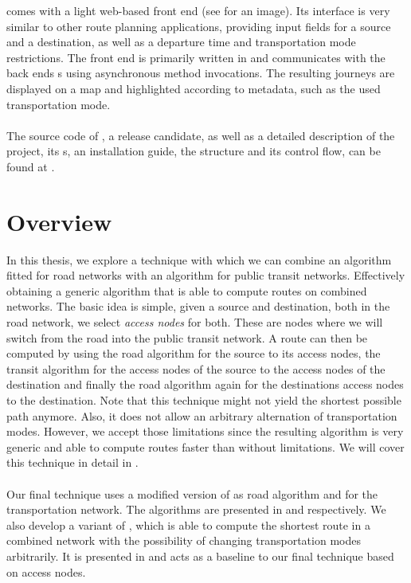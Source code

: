 	\cobweb comes with a light web-based front end (see  for an image). Its interface is very similar to other
	route planning applications, providing input fields for a source and a destination, as well as a departure time and transportation mode
	restrictions. The front end is primarily written in \js and communicates with the back ends {\restApi}s using asynchronous method invocations.
	The resulting journeys are displayed on a map and highlighted according to metadata, such as the used transportation mode.\\\\
	The source code of \cobweb, a release candidate, as well as a detailed description of the project, its {\api}s, an installation guide,
	the structure and its control flow, can be found at .
	
\section{Overview}
	In this thesis, we explore a technique with which we can combine an algorithm fitted for road networks with an algorithm
	for public transit networks. Effectively obtaining a generic algorithm that is able to compute routes on combined networks.
	The basic idea is simple, given a source and destination, both in the road network, we select \textit{access nodes} for both.
	These are nodes where we will switch from the road into the public transit network. A route can then be computed by
	using the road algorithm for the source to its access nodes, the transit algorithm for the access nodes of the source
	to the access nodes of the destination and finally the road algorithm again for the destinations access nodes to
	the destination. Note that this technique might not yield the shortest possible path anymore. Also, it does not allow
	an arbitrary alternation of transportation modes. However, we accept those limitations since the resulting
	algorithm is very generic and able to compute routes faster than without limitations. We will cover this technique in detail
	in .\\\\
	Our final technique uses a modified version of \alt {} as road algorithm and \csa {} for the transportation network.
	The algorithms are presented in  and  respectively.
	We also develop a \multiModal variant of \dijkstra {}, which is able to compute the shortest route in a combined
	network with the possibility of changing transportation modes arbitrarily. It is presented in 
	and acts as a baseline to our final technique based on access nodes.
	
